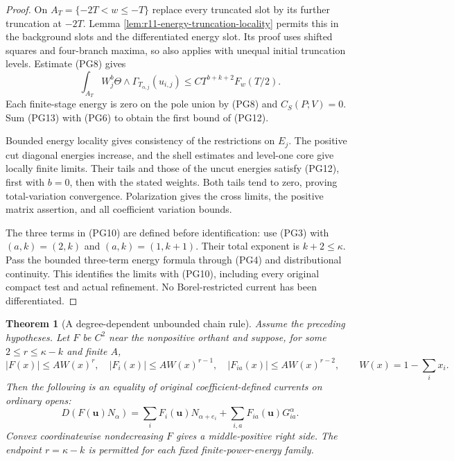 \documentclass[11pt,a4paper]{article}
\numberwithin{equation}{section}
\newtheorem{theorem}{Theorem}[section]
\theoremstyle{definition}
\theoremstyle{remark}
\begin{document}
\begin{proof}
On $A_T=\{-2T<w\leq-T\}$ replace every truncated slot by its
further truncation at $-2T$. Lemma
\ref{lem:r11-energy-truncation-locality} permits this in the
background slots and the differentiated energy slot. Its proof
uses shifted squares and four-branch maxima, so also applies
with unequal initial truncation levels. Estimate (PG8) gives
\[
 \int_{A_T}W_j^b
        \Theta\wedge\Gamma_{T_{\alpha,j}}(u_{i,j})
                  \leq C T^{b+k+2}F_w(T/2).
 \tag{PG13}
\]
Each finite-stage energy is zero on the pole union by (PG8)
and $C_S(P;V)=0$. Sum (PG13) with (PG6) to obtain the first
bound of (PG12).

Bounded energy locality gives consistency of the restrictions
on $E_j$. The positive cut diagonal energies increase, and
the shell estimates and level-one core give locally finite
limits. Their tails and those of the uncut energies satisfy
(PG12), first with $b=0$, then with the stated weights.
Both tails tend to zero, proving total-variation convergence.
Polarization gives the cross limits, the positive matrix
assertion, and all coefficient variation bounds.

The three terms in (PG10) are defined before identification:
use (PG3) with $(a,k)=(2,k)$ and $(a,k)=(1,k+1)$.
Their total exponent is $k+2\leq\kappa$. Pass the bounded
three-term energy formula through (PG4) and distributional
continuity. This identifies the limits with (PG10), including
every original compact test and actual refinement.
No Borel-restricted current has been differentiated.
\end{proof}

\begin{theorem}[A degree-dependent unbounded chain rule]
\label{thm:r11-power-graded-chain}
Assume the preceding hypotheses. Let $F$ be $C^2$ near
the nonpositive orthant and suppose, for some
$2\leq r\leq\kappa-k$ and finite $A$,
\[
 |F(x)|\leq A W(x)^r,\quad
 |F_i(x)|\leq A W(x)^{r-1},\quad
 |F_{ia}(x)|\leq A W(x)^{r-2},
 \qquad W(x)=1-\sum_i x_i.
 \tag{PG14}
\]
Then the following is an equality of original
coefficient-defined currents on ordinary opens:
\[
 D(F(\mathbf u)N_\alpha)
       =\sum_i F_i(\mathbf u)N_{\alpha+e_i}
                         +\sum_{i,a}F_{ia}(\mathbf u)G^\alpha_{ia}.
 \tag{PG15}
\]
Convex coordinatewise nondecreasing $F$ gives a middle-positive
right side. The endpoint $r=\kappa-k$ is permitted for each
fixed finite-power-energy family.
\end{theorem}
\end{document}
